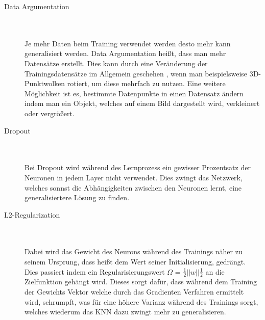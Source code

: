\documentclass{llncs}
\begin{document}
\begin{description}
\item[Data Argumentation]
~\\\\
Je mehr Daten beim Training verwendet werden desto mehr kann generalisiert werden. Data Argumentation heißt, dass man mehr Datensätze erstellt. Dies kann durch eine Veränderung der Trainingsdatensätze im Allgemein geschehen \cite{Grundlagen}, wenn man beispielsweise 3D-Punktwolken rotiert, um diese mehrfach zu nutzen. Eine weitere Möglichkeit ist es, bestimmte Datenpunkte in einen Datensatz ändern indem man ein Objekt, welches auf einem Bild dargestellt wird, verkleinert oder vergrößert\cite{Grundlagen}. \\
\item[Dropout]
~\\\\
Bei Dropout wird während des Lernprozess ein gewisser Prozentsatz der Neuronen in jedem Layer nicht verwendet. Dies zwingt das Netzwerk, welches sonnst die Abhängigkeiten zwischen den Neuronen lernt, eine generalisiertere Lösung zu finden\cite{dropout}.\\
\item[L2-Regularization]
~\\\\
Dabei wird das Gewicht des Neurons während des Trainings näher zu seinem Ursprung, dass heißt dem Wert seiner Initialisierung, gedrängt. Dies passiert indem ein Regularisierungswert $\Omega$ = $\frac{1}{2}||w||\frac{1}{2}$ an die Zielfunktion gehängt wird. Dieses sorgt dafür, dass während dem Training der Gewichts Vektor welche durch das Gradienten Verfahren ermittelt wird, schrumpft, was für eine höhere Varianz während des Trainings sorgt, welches wiederum das KNN dazu zwingt mehr zu generalisieren\cite{Grundlagen}.\\ 
\end{description}
\end{document}
